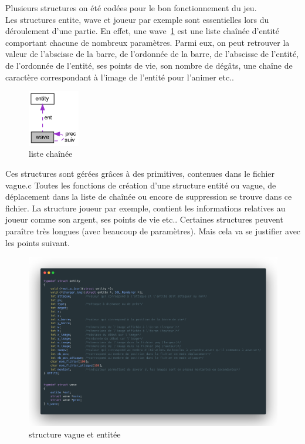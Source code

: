 \documentclass[a4paper,11pt]{article}
\begin{document}
Plusieurs structures on été codées pour le bon fonctionnement du jeu.\\ Les structures entite, wave et joueur par exemple
sont essentielles lors du déroulement d'une partie. En effet, une wave~\ref{image5} est une liste chaînée d'entité comportant chacune de nombreux paramètres. Parmi eux, on peut retrouver la valeur de l'abscisse de la barre, de l'ordonnée de la barre, de l'abscisse de l'entité, de l'ordonnée de l'entité, ses points de vie, son nombre de dégâts, une chaîne de caractère correspondant à l'image de l'entité pour l'animer etc..
\begin{figure}[ht!]
    \centering
    \includegraphics [width=0.2\textwidth]{struct wave.png} 
    \caption {\label{image5} liste chaînée}
    \end{figure}
     \smallbreak
Ces structures sont gérées grâces à des primitives, contenues dans le fichier vague.c
Toutes les fonctions de création d'une structure entité ou vague, de déplacement dans la liste de chaînée ou encore de suppression
se trouve dans ce fichier.
La structure joueur par exemple, contient les informations relatives au joueur comme son argent, ses points de vie etc..
Certaines structures peuvent paraître très longues (avec beaucoup de paramètres). Mais cela va se justifier avec les points suivant.
\begin{figure}[ht!]
    \centering
    \includegraphics [width=1\textwidth]{wave.png} 
    \caption {\label{image6} structure vague et entitée}
    \end{figure}
     \smallbreak
\end{document}
